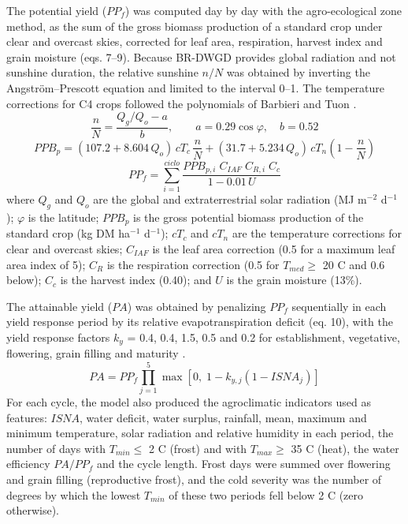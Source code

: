 \documentclass[10pt,a4paper]{article}
\begin{document}
The potential yield ($PP_f$) was computed day by day with the agro-ecological zone method, as the sum of
the gross biomass production of a standard crop under clear and overcast skies, corrected for leaf area,
respiration, harvest index and grain moisture (eqs. 7--9). Because BR-DWGD provides global radiation and
not sunshine duration, the relative sunshine $n/N$ was obtained by inverting the Angström--Prescott
equation and limited to the interval 0--1. The temperature corrections for C4 crops followed the polynomials of Barbieri and Tuon
\citep{doorenbos1979, barbieri1992, allen1998, battisti2015}.
\begin{equation}
\frac{n}{N} = \frac{Q_g/Q_o - a}{b}, \qquad a = 0.29\cos\varphi, \quad b = 0.52
\label{eq:nN}
\end{equation}
\begin{equation}
PPB_p = (107.2 + 8.604\,Q_o)\,cT_c\,\frac{n}{N} + (31.7 + 5.234\,Q_o)\,cT_n\left(1 - \frac{n}{N}\right)
\label{eq:ppbp}
\end{equation}
\begin{equation}
PP_f = \sum_{i=1}^{ciclo} \frac{PPB_{p,i}\; C_{IAF}\; C_{R,i}\; C_c}{1 - 0.01\,U}
\label{eq:ppf}
\end{equation}
where $Q_g$ and $Q_o$ are the global and extraterrestrial solar radiation (MJ m$^{-2}$ d$^{-1}$);
$\varphi$ is the latitude; $PPB_p$ is the gross potential biomass production of the standard crop
(kg DM ha$^{-1}$ d$^{-1}$); $cT_c$ and $cT_n$ are the temperature corrections for clear and overcast
skies; $C_{IAF}$ is the leaf area correction (0.5 for a maximum leaf area index of 5); $C_R$ is the
respiration correction (0.5 for $T_{med} \ge$ 20 \textdegree{}C and 0.6 below); $C_c$ is the harvest
index (0.40); and $U$ is the grain moisture (13\%).

The attainable yield ($PA$) was obtained by penalizing $PP_f$ sequentially in each yield response
period by its relative evapotranspiration deficit (eq. 10), with the yield response factors $k_y$ =
0.4, 0.4, 1.5, 0.5 and 0.2 for establishment, vegetative, flowering, grain filling and maturity
\citep{doorenbos1979, battisti2015}.
\begin{equation}
PA = PP_f \prod_{j=1}^{5} \max\!\left[0,\; 1 - k_{y,j}\left(1 - ISNA_j\right)\right]
\label{eq:pa}
\end{equation}
For each cycle, the model also produced the agroclimatic indicators used as features: $ISNA$, water
deficit, water surplus, rainfall, mean, maximum and minimum temperature, solar radiation and relative
humidity in each period, the number of days with $T_{min} \le$ 2 \textdegree{}C (frost) and with
$T_{max} \ge$ 35 \textdegree{}C (heat), the water efficiency $PA/PP_f$ and the cycle length. Frost
days were summed over flowering and grain filling (reproductive frost), and the cold severity was the
number of degrees by which the lowest $T_{min}$ of these two periods fell below 2 \textdegree{}C (zero
otherwise).
\end{document}
